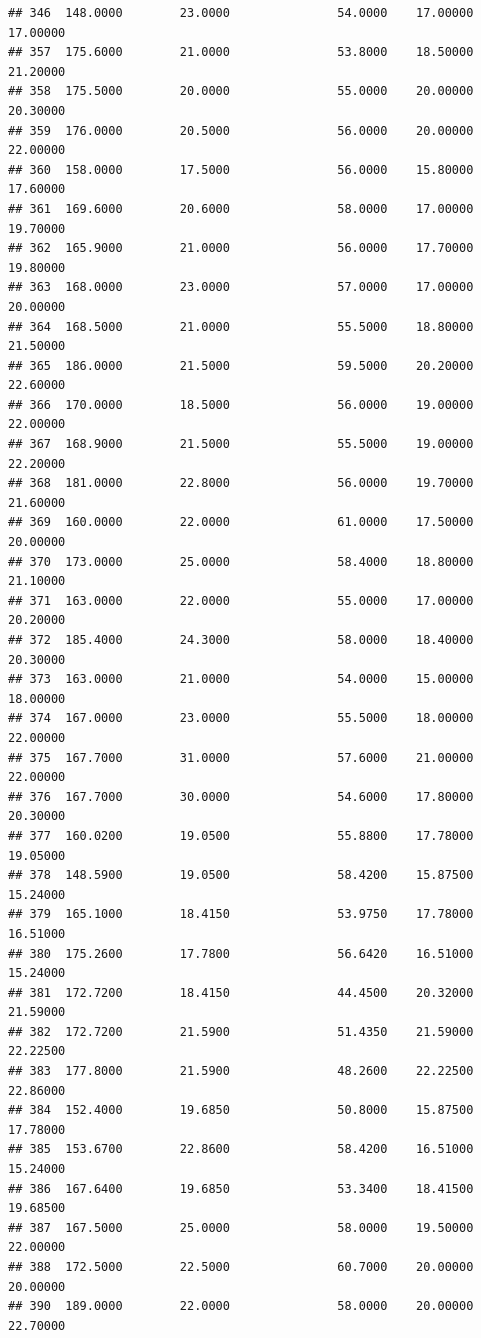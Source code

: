\documentclass[]{article}
\begin{document}
\begin{verbatim}
## 346  148.0000        23.0000               54.0000    17.00000   17.00000
## 357  175.6000        21.0000               53.8000    18.50000   21.20000
## 358  175.5000        20.0000               55.0000    20.00000   20.30000
## 359  176.0000        20.5000               56.0000    20.00000   22.00000
## 360  158.0000        17.5000               56.0000    15.80000   17.60000
## 361  169.6000        20.6000               58.0000    17.00000   19.70000
## 362  165.9000        21.0000               56.0000    17.70000   19.80000
## 363  168.0000        23.0000               57.0000    17.00000   20.00000
## 364  168.5000        21.0000               55.5000    18.80000   21.50000
## 365  186.0000        21.5000               59.5000    20.20000   22.60000
## 366  170.0000        18.5000               56.0000    19.00000   22.00000
## 367  168.9000        21.5000               55.5000    19.00000   22.20000
## 368  181.0000        22.8000               56.0000    19.70000   21.60000
## 369  160.0000        22.0000               61.0000    17.50000   20.00000
## 370  173.0000        25.0000               58.4000    18.80000   21.10000
## 371  163.0000        22.0000               55.0000    17.00000   20.20000
## 372  185.4000        24.3000               58.0000    18.40000   20.30000
## 373  163.0000        21.0000               54.0000    15.00000   18.00000
## 374  167.0000        23.0000               55.5000    18.00000   22.00000
## 375  167.7000        31.0000               57.6000    21.00000   22.00000
## 376  167.7000        30.0000               54.6000    17.80000   20.30000
## 377  160.0200        19.0500               55.8800    17.78000   19.05000
## 378  148.5900        19.0500               58.4200    15.87500   15.24000
## 379  165.1000        18.4150               53.9750    17.78000   16.51000
## 380  175.2600        17.7800               56.6420    16.51000   15.24000
## 381  172.7200        18.4150               44.4500    20.32000   21.59000
## 382  172.7200        21.5900               51.4350    21.59000   22.22500
## 383  177.8000        21.5900               48.2600    22.22500   22.86000
## 384  152.4000        19.6850               50.8000    15.87500   17.78000
## 385  153.6700        22.8600               58.4200    16.51000   15.24000
## 386  167.6400        19.6850               53.3400    18.41500   19.68500
## 387  167.5000        25.0000               58.0000    19.50000   22.00000
## 388  172.5000        22.5000               60.7000    20.00000   20.00000
## 390  189.0000        22.0000               58.0000    20.00000   22.70000

\end{verbatim}
\end{document}
